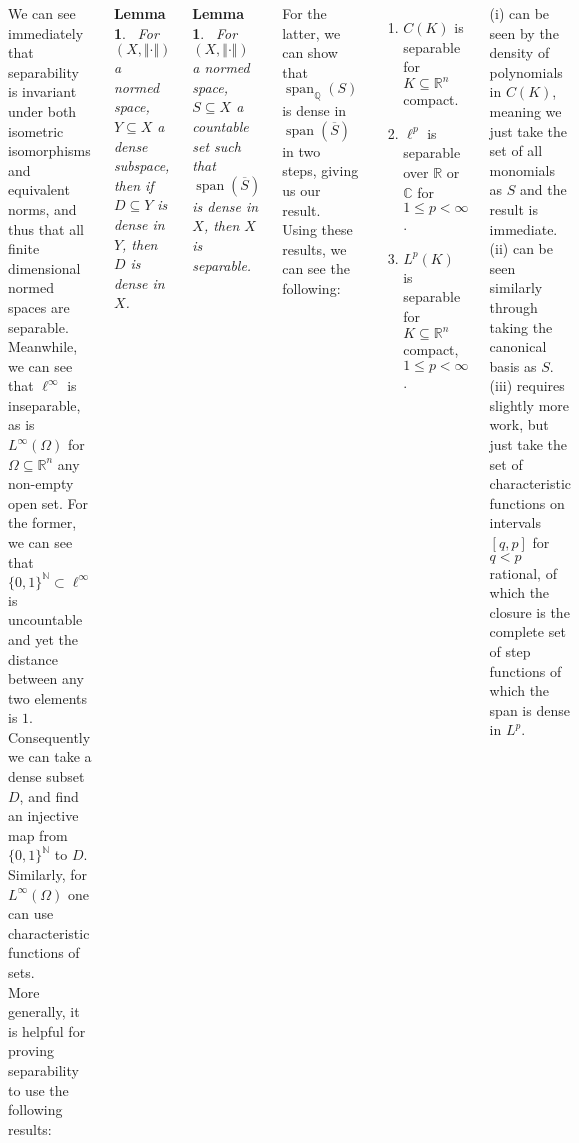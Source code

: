 \documentclass{tikzposter} %
\DeclareMathOperator{\Span}{span}
\newtheorem{lemma}[theorem]{Lemma}
\begin{document}
\begin{columns}
{    We can see immediately that separability is invariant under both isometric isomorphisms and equivalent norms, and thus that all finite dimensional normed spaces are separable. \\

    Meanwhile, we can see that $\ell^{\infty}$ is inseparable, as is $L^{\infty}(\Omega)$ for $\Omega \subseteq \mathbb{R}^{n}$ any non-empty open set. For the former, we can see that $\{0,1\}^{\mathbb{N}} \subset \ell^{\infty}$ is uncountable and yet the distance between any two elements is $1$. Consequently we can take a dense subset $D$, and find an injective map from $\{0,1\}^{\mathbb{N}}$ to $D$. \\

    Similarly, for $L^{\infty}(\Omega)$ one can use characteristic functions of sets. \\

    More generally, it is helpful for proving separability to use the following results:
    \begin{lemma}
    \ For $(X, \Vert \cdot \Vert)$ a normed space, $Y \subseteq X$ a dense subspace, then if $D \subseteq Y$ is dense in $Y$, then $D$ is dense in $X$.
    \end{lemma}
    \hphantom{}

    \begin{lemma}
    \ For $(X, \Vert \cdot \Vert)$ a normed space, $S \subseteq X$ a countable set such that $\Span(\overline{S})$ is dense in $X$, then $X$ is separable.
    \end{lemma}
    \hphantom{}

    For the latter, we can show that $\Span_{\mathbb{Q}}(S)$ is dense in $\Span(\overline{S})$ in two steps, giving us our result. \\

    Using these results, we can see the following:
    \begin{enumerate}[label=\roman*.]
            \item $C(K)$ is separable for $K \subseteq \mathbb{R}^{n}$ compact.
            \item $\ell^{p}$ is separable over $\mathbb{R}$ or $\mathbb{C}$ for $1 \le p < \infty$.
            \item $L^{p}(K)$ is separable for $K \subseteq \mathbb{R}^{n}$ compact, $1 \le p < \infty$.
    \end{enumerate}
    \hphantom{}

    (i) can be seen by the density of polynomials in $C(K)$, meaning we just take the set of all monomials as $S$ and the result is immediate. (ii) can be seen similarly through taking the canonical basis as $S$. (iii) requires slightly more work, but just take the set of characteristic functions on intervals $[q,p]$ for $q < p$ rational, of which the closure is the complete set of step functions of which the span is dense in $L^{p}$. \\

}
\end{columns}
\end{document}
